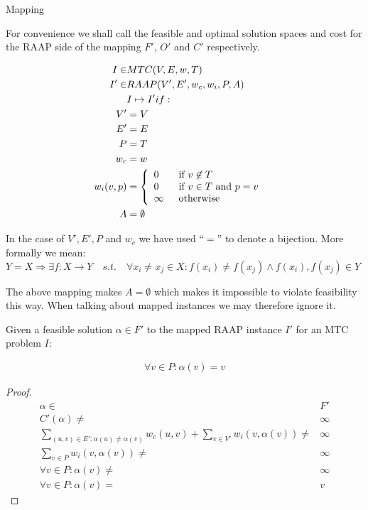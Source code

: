 \documentclass{article}
\begin{document}
\begin{definition}
Mapping

For convenience we shall call the feasible and optimal solution spaces and cost for the RAAP side of the mapping $F'$, $O'$ and $C'$ respectively.

\begin{align}
	\nonumber I \in & MTC(V,E,w,T) &\\
	\nonumber I' \in & RAAP(V', E', w_c, w_i, P, A) &\\
	\nonumber & I \mapsto I' if: &\\
	\nonumber V' & = V\\
	\nonumber E' & = E\\
	\nonumber P & = T\\
	\nonumber w_c & = w\\
	\nonumber w_i(v,p) & = \mbox{$\left\{ 
		\begin{array}{l l}
			0 \quad & \mbox{if $v \not\in T$}\\
			0 & \mbox{if $v \in T$ and $p = v$}\\
			\infty & \mbox{otherwise}\\ \end{array} \right.$} \\
	\nonumber A & = \emptyset
\end{align}

In the case of $V', E', P$ and $w_c$ we have used ``$=$'' to denote a bijection.
More formally we mean: $Y = X \Rightarrow \exists f : X \rightarrow Y \quad s.t. \quad \forall x_i \neq x_j \in X : f(x_i) \neq f(x_j) \wedge f(x_i), f(x_j) \in Y$

The above mapping makes $A = \emptyset$ which makes it impossible to violate feasibility this way.
When talking about mapped instances we may therefore ignore it.
\end{definition}

\begin{lemma}
\label{FORCEASSIGN}
Given a feasible solution $\alpha \in F'$ to the mapped RAAP instance $I'$ for an MTC problem $I$:

\begin{align}
	\nonumber \forall v \in P : \alpha(v) = v
\end{align}
\end{lemma}

\begin{proof}
\begin{align}
	\nonumber \alpha \in & F' \\
	\nonumber C'(\alpha) \neq & \infty \\
	\nonumber \displaystyle\sum\limits_{(u,v) \in E' : \alpha(u) \neq \alpha(v)} w_c(u,v) + \displaystyle\sum\limits_{v \in V'} w_i(v, \alpha(v)) \neq & \infty \\
	\nonumber \displaystyle\sum\limits_{v \in P} w_i(v, \alpha(v)) \neq & \infty \\
	\nonumber \forall v \in P : \alpha(v) \neq & \infty \\
	\nonumber \forall v \in P : \alpha(v) = & v
\end{align}
\end{proof}
\end{document}

